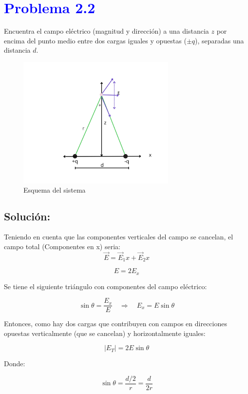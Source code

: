 \documentclass[12pt]{article}
\newcommand{\question}[1]{\textcolor{blue}{\textbf{#1}}}
\begin{document}


\section*{\question{Problema 2.2} }Encuentra el campo eléctrico (magnitud y dirección) a una distancia \( z \) por encima del punto medio entre dos cargas iguales y opuestas (\( \pm q \)), separadas una distancia \( d \).

\begin{figure}[ht] 
    \centering
    \includegraphics[width=0.7\textwidth]{imagenes/eje2.2 (1).jpg}
    \caption{Esquema del sistema}
    \label{Esquema1}
\end{figure}

\subsection*{Solución:}
Teniendo en cuenta que las componentes verticales del campo se cancelan, el campo total (Componentes en x) seria: 
\[
\vec{E} = \vec{E}_1x + \vec{E}_2x  
\]

\[
{E} = 2{E}_x
\]

Se tiene el siguiente triángulo con componentes del campo eléctrico:

\[
\sin \theta = \frac{E_x}{E} \quad \Rightarrow \quad E_x = E \sin \theta
\]

Entonces, como hay dos cargas que contribuyen con campos en direcciones opuestas verticalmente (que se cancelan) y horizontalmente iguales:

\[
|E_T| = 2E \sin \theta
\]

Donde:

\[
\sin \theta = \frac{d/2}{r} = \frac{d}{2r}
\]
\end{document}
